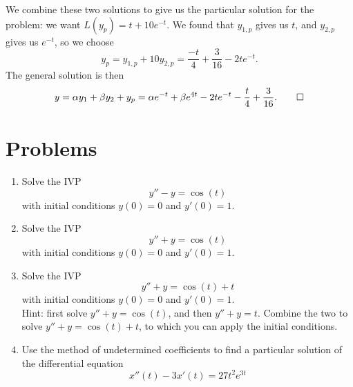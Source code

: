 \documentclass[12pt]{book}
\begin{document}
We combine these two solutions to give us the particular solution for the
problem: we want $L(y_p) = t+10e^{-t}$. We found that $y_{1,p}$ gives us $t$,
and $y_{2,p}$ gives us $e^{-t}$, so we choose
\begin{dmath*}
  y_p = y_{1,p} + 10 y_{2,p} = \frac{-t}{4} + \frac{3}{16} -2 t e^{-t}.
\end{dmath*}
The general solution is then
\begin{dmath*}
y = \alpha y_1 + \beta y_2 + y_p
= \alpha e^{-t} + \beta e^{4t} -2 t e^{-t} -\frac{t}{4} + \frac{3}{16}. \qed
\end{dmath*}


\section{Problems}

\begin{enumerate}

\item
  Solve the IVP
  \begin{dmath*}
  y'' - y = \cos(t)
  \end{dmath*}
  with initial conditions $y(0)=0$ and $y'(0)=1$.

\item
  Solve the IVP
  \begin{dmath*}
  y'' + y = \cos(t)
  \end{dmath*}
  with initial conditions $y(0)=0$ and $y'(0)=1$.

\item
  Solve the IVP
  \begin{dmath*}
    y'' + y = \cos(t) + t
  \end{dmath*}
  with initial conditions $y(0)=0$ and $y'(0)=1$.\\
  Hint: first solve $y'' + y = \cos(t)$, and then $y'' + y = t$. Combine
  the two to solve $y'' + y = \cos(t) + t$, to which you can apply the
  initial conditions.

\item
  Use the method of undetermined coefficients to find a particular solution of
  the differential equation
  \begin{dmath*}
    x''(t) - 3x'(t) = 27t^2e^{3t}
  \end{dmath*}

\end{enumerate}
\end{document}
